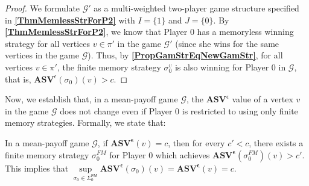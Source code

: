 \begin{proof}
We formulate $\mathcal{G'}$ as a multi-weighted two-player game structure specified in \textbf{\cref{ThmMemlessStrForP2}} with $I = \{1\}$ and $J = \{0\}$. By \textbf{\cref{ThmMemlessStrForP2}}, we know that Player 0 has a memoryless winning strategy for all vertices $v \in \pi'$ in the game $\mathcal{G'}$ (since she wins for the same vertices in the game $\mathcal{G}$).
Thus, by \textbf{\cref{PropGamStrEqNewGamStr}}, for all vertices $v \in \pi'$, the finite memory strategy $\sigma_0^v$ is also winning for Player 0 in $\mathcal{G}$, that is, $\mathbf{ASV}^{\epsilon}(\sigma_0)(v) > c$.
\end{proof}

Now, we establish that, in a mean-payoff game $\mathcal{G}$, the $\mathbf{ASV}^{\epsilon}$ value of a vertex $v$ in the game $\mathcal{G}$ does not change even if Player 0 is restricted to using only finite memory strategies. Formally, we state that:

\begin{corollary}
\label{CorASVEqASVFin}
In a mean-payoff game $\mathcal{G}$, if $\mathbf{ASV^{\epsilon}}(v) = c$, then for every $c' < c$, there exists a finite memory strategy $\sigma_0^{FM}$ for Player 0 which achieves $\mathbf{ASV^{\epsilon}}(\sigma_0^{FM})(v) > c'$. This implies that $\sup\limits_{\sigma_0 \in \Sigma_0^{\mathsf{FM}}} \mathbf{ASV^{\epsilon}}(\sigma_0)(v) = \mathbf{ASV^{\epsilon}}(v) = c$.
\end{corollary}